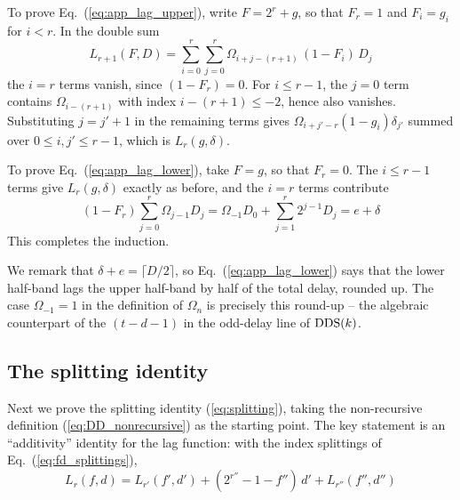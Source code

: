 \documentclass{article}
\numberwithin{equation}{section}   %
\def\DDS{{\rm DDS}}
\begin{document}
To prove Eq.\ (\ref{eq:app_lag_upper}), write $F = 2^r + g$, so that $F_r = 1$ and $F_i = g_i$
for $i < r$. In the double sum
\begin{equation}
L_{r+1}(F, D) = \sum_{i=0}^{r} \sum_{j=0}^{r} \Omega_{i+j-(r+1)} \, (1 - F_i) \, D_j
\end{equation}
the $i=r$ terms vanish, since $(1 - F_r) = 0$. For $i \le r-1$, the $j=0$ term contains
$\Omega_{i-(r+1)}$ with index $i-(r+1) \le -2$, hence also vanishes. Substituting $j = j'+1$ in
the remaining terms gives $\Omega_{i+j'-r} (1-g_i) \delta_{j'}$ summed over
$0 \le i, j' \le r-1$, which is $L_r(g, \delta)$.

To prove Eq.\ (\ref{eq:app_lag_lower}), take $F = g$, so that $F_r = 0$. The $i \le r-1$ terms
give $L_r(g,\delta)$ exactly as before, and the $i = r$ terms contribute
\begin{equation}
(1 - F_r) \sum_{j=0}^{r} \Omega_{j-1} D_j
 = \Omega_{-1} D_0 + \sum_{j=1}^{r} 2^{j-1} D_j = e + \delta
\end{equation}
This completes the induction.

We remark that $\delta + e = \lceil D/2 \rceil$, so Eq.\ (\ref{eq:app_lag_lower}) says that the
lower half-band lags the upper half-band by half of the total delay, rounded up. The case
$\Omega_{-1} = 1$ in the definition of $\Omega_n$ is precisely this round-up -- the algebraic
counterpart of the $(t-d-1)$ in the odd-delay line of $\DDS(k)$.

\subsection{The splitting identity}
\label{app:splitting_proof}

Next we prove the splitting identity (\ref{eq:splitting}), taking the non-recursive definition
(\ref{eq:DD_nonrecursive}) as the starting point. The key statement is an ``additivity''
identity for the lag function: with the index splittings of Eq.\ (\ref{eq:fd_splittings}),
\begin{equation}
L_r(f, d) = L_{r'}(f', d') + (2^{r''} - 1 - f'') \, d' + L_{r''}(f'', d'')
\label{eq:lag_additivity}
\end{equation}
\end{document}
